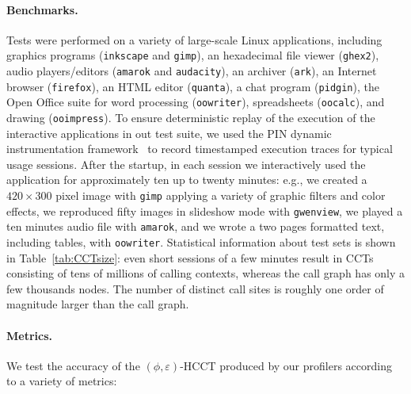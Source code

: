 \documentclass{sigplanconf}
\begin{document}
\paragraph{Benchmarks.}  Tests were performed on a variety of large-scale Linux applications, including graphics programs ({\tt inkscape} and {\tt gimp}), an hexadecimal file viewer ({\tt ghex2}), audio players/editors ({\tt amarok} and {\tt audacity}), an archiver ({\tt ark}), an Internet browser ({\tt firefox}), an HTML editor ({\tt quanta}), a chat program ({\tt pidgin}), the Open Office suite for word processing ({\tt oowriter}), spreadsheets ({\tt oocalc}), and drawing ({\tt ooimpress}). To ensure deterministic replay of the execution of the interactive applications in out test suite, we used the PIN dynamic instrumentation framework~\cite{Pin05} to record timestamped execution traces for typical usage sessions. After the startup, in each session we interactively used the application for approximately ten up to twenty minutes: e.g., we created a $420\times 300$ pixel image with {\tt gimp} applying a variety of graphic filters and color effects, we reproduced fifty images in slideshow mode with {\tt gwenview}, we played a ten minutes audio file with {\tt amarok}, and we wrote a two pages formatted text, including tables, with {\tt oowriter}. Statistical information about test sets is shown in Table~\ref{tab:CCTsize}: even short sessions of a few minutes result in CCTs consisting of tens of millions of calling contexts, whereas the call graph has only a few thousands nodes. The number of distinct call sites is roughly one order of magnitude larger than the call graph. 

\paragraph{Metrics.} We test the accuracy of the $(\phi,\varepsilon)$-HCCT produced by our profilers according to a variety of metrics:
\end{document}
